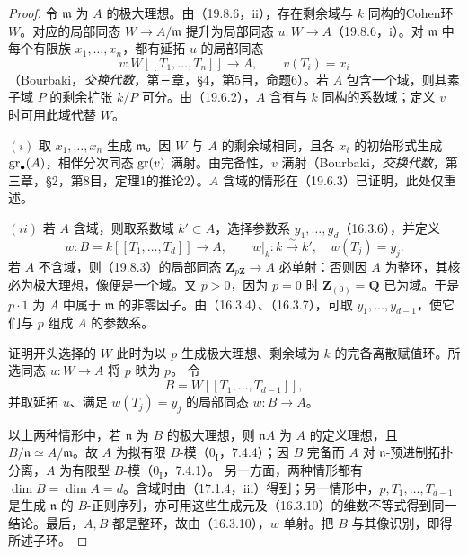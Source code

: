 \begin{proof}
令 $\mathfrak m$ 为 $A$ 的极大理想。由（19.8.6，ii），存在剩余域与 $k$ 同构的Cohen环 $W$。对应的局部同态 $W\to A/\mathfrak m$ 提升为局部同态 $u:W\to A$（19.8.6，i）。对 $\mathfrak m$ 中每个有限族 $x_1,\ldots,x_n$，都有延拓 $u$ 的局部同态
\[
 v:W[[T_1,\ldots,T_n]]\longrightarrow A,
 \qquad v(T_i)=x_i
\]
（Bourbaki，\textit{交换代数}，第三章，§4，第5目，命题6）。若 $A$ 包含一个域，则其素子域 $P$ 的剩余扩张 $k/P$ 可分。由（19.6.2），$A$ 含有与 $k$ 同构的系数域；定义 $v$ 时可用此域代替 $W$。

$(i)$ 取 $x_1,\ldots,x_n$ 生成 $\mathfrak m$。因 $W$ 与 $A$ 的剩余域相同，且各 $x_i$ 的初始形式生成 $\operatorname{gr}_\bullet(A)$，相伴分次同态 $\operatorname{gr}(v)$ 满射。由完备性，$v$ 满射（Bourbaki，\textit{交换代数}，第三章，§2，第8目，定理1的推论2）。$A$ 含域的情形在（19.6.3）已证明，此处仅重述。

$(ii)$ 若 $A$ 含域，则取系数域 $k'\subset A$，选择参数系 $y_1,\ldots,y_d$（16.3.6），并定义
\[
 w:B=k[[T_1,\ldots,T_d]]\longrightarrow A,
 \qquad w|_k:k\xrightarrow{\sim}k',\quad w(T_j)=y_j.
\]
若 $A$ 不含域，则（19.8.3）的局部同态 $\mathbf Z_{p\mathbf Z}\to A$ 必单射：否则因 $A$ 为整环，其核必为极大理想，像便是一个域。又 $p>0$，因为 $p=0$ 时 $\mathbf Z_{(0)}=\mathbf Q$ 已为域。于是 $p\cdot1$ 为 $A$ 中属于 $\mathfrak m$ 的非零因子。由（16.3.4）、（16.3.7），可取 $y_1,\ldots,y_{d-1}$，使它们与 $p$ 组成 $A$ 的参数系。

证明开头选择的 $W$ 此时为以 $p$ 生成极大理想、剩余域为 $k$ 的完备离散赋值环。所选同态 $u:W\to A$ 将 $p$ 映为 $p$。
令
\[
 B=W[[T_1,\ldots,T_{d-1}]],
\]
并取延拓 $u$、满足 $w(T_j)=y_j$ 的局部同态 $w:B\to A$。

以上两种情形中，若 $\mathfrak n$ 为 $B$ 的极大理想，则 $\mathfrak nA$ 为 $A$ 的定义理想，且 $B/\mathfrak n\simeq A/\mathfrak m$。故 $A$ 为拟有限 $B$-模（$0_{\mathrm I}$，7.4.4）；因 $B$ 完备而 $A$ 对 $\mathfrak n$-预进制拓扑分离，$A$ 为有限型 $B$-模（$0_{\mathrm I}$，7.4.1）。
另一方面，两种情形都有 $\dim B=\dim A=d$。含域时由（17.1.4，iii）得到；另一情形中，$p,T_1,\ldots,T_{d-1}$ 是生成 $\mathfrak n$ 的 $B$-正则序列，亦可用这些生成元及（16.3.10）的维数不等式得到同一结论。最后，$A,B$ 都是整环，故由（16.3.10），$w$ 单射。把 $B$ 与其像识别，即得所述子环。
\end{proof}

